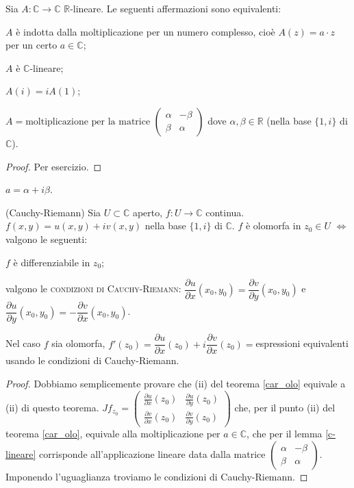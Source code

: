 \begin{lm} \label{c-lineare}
  Sia $A: \mathbb{C} \longrightarrow \mathbb{C}$ $\mathbb{R}$-lineare. Le seguenti affermazioni sono equivalenti:
  \begin{nlist}
    \item $A$ è indotta dalla moltiplicazione per un numero complesso, cioè $A(z)=a \cdot z$ per un certo $a \in \mathbb{C}$;
    \item $A$ è $\mathbb{C}$-lineare;
    \item $A(i)=iA(1)$;
    \item $A=\text{moltiplicazione per la matrice }\begin{pmatrix}
      \alpha & -\beta\\
      \beta & \alpha
  \end{pmatrix}$ dove $\alpha, \beta \in \mathbb{R}$ (nella base $\{1, i\}$ di $\mathbb{C}$).
  \end{nlist}
\end{lm}

\begin{proof}
  Per esercizio.
\end{proof}

\begin{oss}
  $a=\alpha+i\beta$.
\end{oss}

\begin{thm}
  (Cauchy-Riemann) Sia $U \subset \mathbb{C}$ aperto, $f:U \longrightarrow \mathbb{C}$ continua. $f(x, y)=u(x, y)+iv(x, y)$ nella base $\{1, i\}$ di $\mathbb{C}$. $f$ è olomorfa in $z_0 \in U$ $\iff$ valgono le seguenti:
  \begin{nlist}
    \item $f$ è differenziabile in $z_0$;
    \item valgono le \textsc{condizioni di Cauchy-Riemann}: $\dfrac{\partial u}{\partial x}(x_0, y_0)=\dfrac{\partial v}{\partial y}(x_0, y_0)$ e $\dfrac{\partial u}{\partial y}(x_0, y_0)=-\dfrac{\partial v}{\partial x}(x_0, y_0)$.
  \end{nlist}
  Nel caso $f$ sia olomorfa, $f'(z_0)=\dfrac{\partial u}{\partial x}(z_0)+i\dfrac{\partial v}{\partial x}(z_0)=$espressioni equivalenti usando le condizioni di Cauchy-Riemann.
\end{thm}

\begin{proof}
  Dobbiamo semplicemente provare che (ii) del teorema \ref{car_olo} equivale a (ii) di questo teorema. $Jf_{z_0}=\begin{pmatrix}
    \frac{\partial u}{\partial x}(z_0) & \frac{\partial u}{\partial y}(z_0)\\
    \frac{\partial v}{\partial x}(z_0) & \frac{\partial v}{\partial y}(z_0)
\end{pmatrix}$ che, per il punto (ii) del teorema \ref{car_olo}, equivale alla moltiplicazione per $a \in \mathbb{C}$, che per il lemma \ref{c-lineare} corrisponde all'applicazione lineare data dalla matrice $\begin{pmatrix}
  \alpha & -\beta\\
  \beta & \alpha
\end{pmatrix}$. Imponendo l'uguaglianza troviamo le condizioni di Cauchy-Riemann.
\end{proof}
